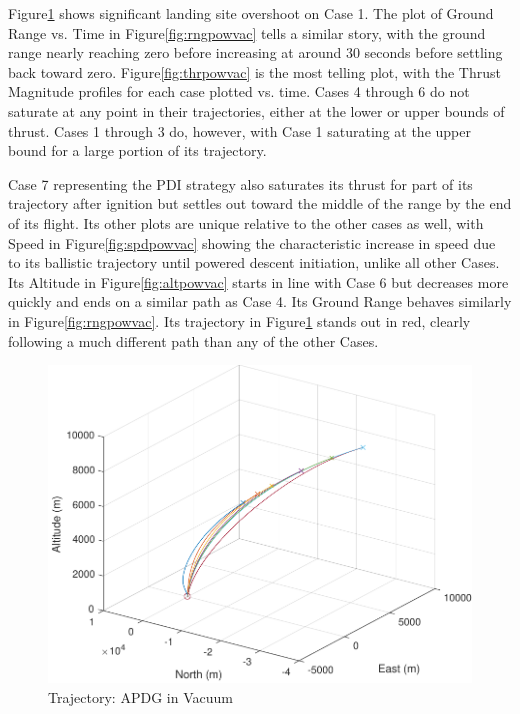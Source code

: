 Figure\:\ref{fig:trajpowvac} shows significant landing site overshoot on Case 1. The plot of Ground Range vs. Time in Figure\:\ref{fig:rngpowvac} tells a similar story, with the ground range nearly reaching zero before increasing at around 30 seconds before settling back toward zero. Figure\:\ref{fig:thrpowvac} is the most telling plot, with the Thrust Magnitude profiles for each case plotted vs. time. Cases 4 through 6 do not saturate at any point in their trajectories, either at the lower or upper bounds of thrust. Cases 1 through 3 do, however, with Case 1 saturating at the upper bound for a large portion of its trajectory. 

Case 7 representing the PDI strategy also saturates its thrust for part of its trajectory after ignition but settles out toward the middle of the range by the end of its flight. Its other plots are unique relative to the other cases as well, with Speed in Figure\:\ref{fig:spdpowvac} showing the characteristic increase in speed due to its ballistic trajectory until powered descent initiation, unlike all other Cases. Its Altitude in Figure\:\ref{fig:altpowvac} starts in line with Case 6 but decreases more quickly and ends on a similar path as Case 4. Its Ground Range behaves similarly in Figure\:\ref{fig:rngpowvac}. Its trajectory in Figure\:\ref{fig:trajpowvac} stands out in red, clearly following a much different path than any of the other Cases.

\begin{figure}[H]
	\centering
	\begin{minipage}{4.3 in}
		\includegraphics[width=\linewidth]{Figures/trajpowvac.pdf}
		\caption{Trajectory: APDG in Vacuum \label{fig:trajpowvac} }
	\end{minipage}
\end{figure}

